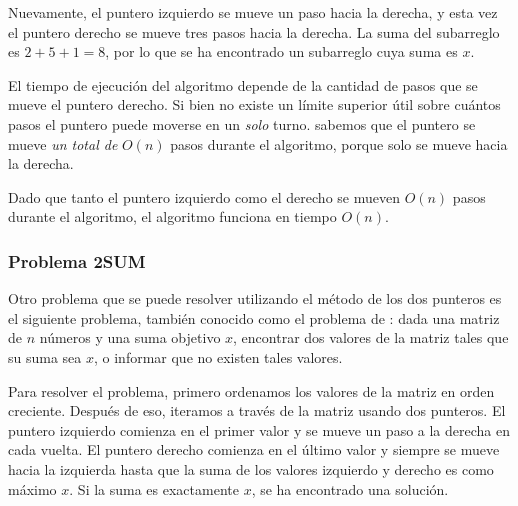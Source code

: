 Nuevamente, el puntero izquierdo se mueve un paso hacia la derecha,
y esta vez el puntero derecho se mueve tres
pasos hacia la derecha.
La suma del subarreglo es $2+5+1=8$, por lo que se ha encontrado un subarreglo
cuya suma es $x$.

\begin{center}
\end{center}

El tiempo de ejecución del algoritmo depende de
la cantidad de pasos que se mueve el puntero derecho.
Si bien no existe un límite superior útil sobre cuántos pasos el
puntero puede moverse en un \emph{solo} turno.
sabemos que el puntero se mueve \emph{un total de}
$O(n)$ pasos durante el algoritmo,
porque solo se mueve hacia la derecha.

Dado que tanto el puntero izquierdo como el derecho
se mueven $O(n)$ pasos durante el algoritmo,
el algoritmo funciona en tiempo $O(n)$.

\subsubsection{Problema 2SUM}


Otro problema que se puede resolver utilizando
el método de los dos punteros es el siguiente problema,
también conocido como el problema de :
dada una matriz de $n$ números y
una suma objetivo $x$, encontrar
dos valores de la matriz tales que su suma sea $x$,
o informar que no existen tales valores.

Para resolver el problema, primero
ordenamos los valores de la matriz en orden creciente.
Después de eso, iteramos a través de la matriz usando
dos punteros.
El puntero izquierdo comienza en el primer valor
y se mueve un paso a la derecha en cada vuelta.
El puntero derecho comienza en el último valor
y siempre se mueve hacia la izquierda hasta que la suma de los
valores izquierdo y derecho es como máximo $x$.
Si la suma es exactamente $x$,
se ha encontrado una solución.

